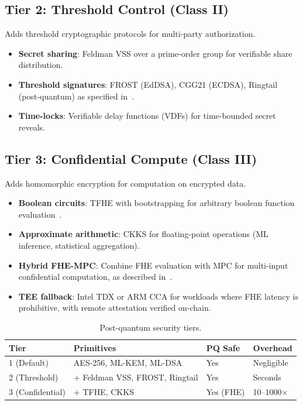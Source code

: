\subsection{Tier 2: Threshold Control (Class II)}

Adds threshold cryptographic protocols for multi-party authorization.

\begin{itemize}[nosep]
  \item \textbf{Secret sharing}: Feldman VSS over a prime-order group for
        verifiable share distribution.
  \item \textbf{Threshold signatures}: FROST (EdDSA), CGG21 (ECDSA), Ringtail
        (post-quantum) as specified in~\cite{lux-mchain-mpc}.
  \item \textbf{Time-locks}: Verifiable delay functions (VDFs) for time-bounded
        secret reveals.
\end{itemize}

\subsection{Tier 3: Confidential Compute (Class III)}

Adds homomorphic encryption for computation on encrypted data.

\begin{itemize}[nosep]
  \item \textbf{Boolean circuits}: TFHE with bootstrapping for arbitrary boolean
        function evaluation~\cite{lux-tfhe}.
  \item \textbf{Approximate arithmetic}: CKKS for floating-point operations
        (ML inference, statistical aggregation).
  \item \textbf{Hybrid FHE-MPC}: Combine FHE evaluation with MPC for
        multi-input confidential computation, as described
        in~\cite{lux-fhe-mpc-hybrid}.
  \item \textbf{TEE fallback}: Intel TDX or ARM CCA for workloads where FHE
        latency is prohibitive, with remote attestation verified on-chain.
\end{itemize}

\begin{table}[H]
\centering
\caption{Post-quantum security tiers.}
\label{tab:pq}
\begin{tabular}{@{}llll@{}}
\toprule
\textbf{Tier} & \textbf{Primitives} & \textbf{PQ Safe} & \textbf{Overhead} \\
\midrule
1 (Default) & AES-256, ML-KEM, ML-DSA & Yes & Negligible \\
2 (Threshold) & + Feldman VSS, FROST, Ringtail & Yes & Seconds \\
3 (Confidential) & + TFHE, CKKS & Yes (FHE) & 10--1000$\times$ \\
\bottomrule
\end{tabular}
\end{table}

